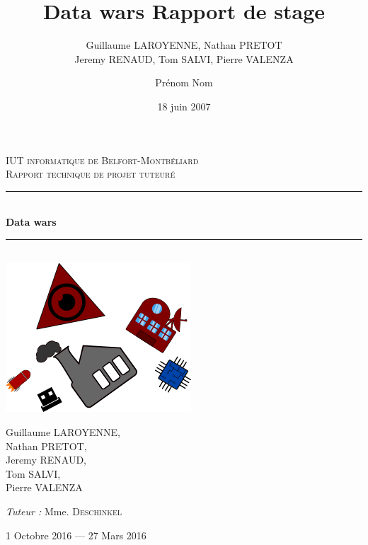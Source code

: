 \documentclass[a4paper, titlepage]{livret}
\title{Data wars }
\author{Guillaume LAROYENNE, Nathan PRETOT \\ Jeremy RENAUD, Tom SALVI, Pierre VALENZA}
\title{Rapport de stage}      %
\author{Prénom Nom}           %
\date{18 juin 2007}           %
\newcommand{\HRule}{\rule{\linewidth}{0.5mm}}
\begin{document}
\begin{titlepage}
  \begin{sffamily}
  \begin{center}


    \textsc{\LARGE IUT informatique de Belfort-Montbéliard}\\[2cm]

    \textsc{\Large Rapport technique de projet tuteuré}\\[1.5cm]

    \HRule \\[0.4cm]
    { \huge \bfseries Data wars\\[0.4cm] }

    \HRule \\[2cm]
    \includegraphics[scale=0.4]{../mainPageimg.png}
    \\[2cm]

    \begin{minipage}{0.4\textwidth}
      \begin{flushleft} \large
        Guillaume \textsc{LAROYENNE}, \\ Nathan \textsc{PRETOT}, \\ Jeremy \textsc{RENAUD}, \\ Tom \textsc{SALVI}, \\ Pierre \textsc{VALENZA}
      \end{flushleft}
    \end{minipage}
    \begin{minipage}{0.4\textwidth}
      \begin{flushright} \large
        \emph{Tuteur :} Mme. \textsc{Deschinkel} \\
      \end{flushright}
    \end{minipage}

    \vfill

    {\large 1\ier{} Octobre 2016 — 27 Mars 2016}

  \end{center}
  \end{sffamily}
\end{titlepage}
\end{document}
